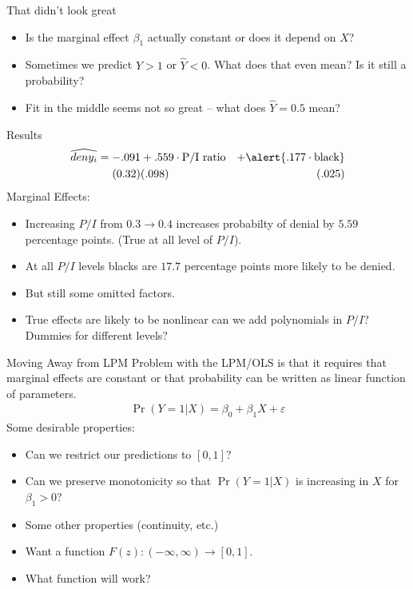 \documentclass[aspectratio=169,11pt]{beamer}
\begin{document}
\begin{frame}{That didn't look great}
\begin{itemize}
\item Is the marginal effect $\beta_1$ actually constant or does it depend on $X$?
\item Sometimes we predict $\hat{Y} >1$ or $\hat{Y} <0$. What does that even mean? Is it still a probability?
\item Fit in the middle seems not so great -- what does $\hat{Y} = 0.5$ mean?
\end{itemize}
\end{frame}

\begin{frame}{Results}
\begin{align*}
\widehat{deny_i}= -.091 &+ .559 \cdot \text{P/I ratio}& + \alert{.177 \cdot \text{black}} \\
(0.32)&( .098) & (.025)\\
\end{align*}
Marginal Effects: 
\begin{itemize}
\item Increasing $P/I$ from $0.3 \rightarrow 0.4$ increases probabilty of denial by $5.59$ percentage points. (True at all level of $P/I$).
\item At all $P/I$ levels blacks are $17.7$ percentage points more likely to be denied.
\item But still some omitted factors.
\item True effects are likely to be \alert{nonlinear} can we add polynomials in $P/I$? Dummies for different levels? 
\end{itemize}
\end{frame}


\begin{frame}{Moving Away from LPM}
Problem with the LPM/OLS is that it requires that \alert{marginal effects are constant} or that probability can be written as linear function of parameters.
\begin{align*}
\Pr(Y=1 | X) = \beta_0 + \beta_1 X+ \varepsilon
\end{align*}
Some desirable properties:
\begin{itemize}
\item Can we restrict our predictions to $[0,1]$?
\item Can we preserve \alert{monotonicity} so that $\Pr(Y=1| X)$ is increasing in $X$ for $\beta_1 >0$?
\item Some other properties (continuity, etc.) \pause
\item Want a function $F(z): (-\infty,\infty) \rightarrow [0,1]$.
\item What function will work?
\end{itemize}
\end{frame}
\end{document}
